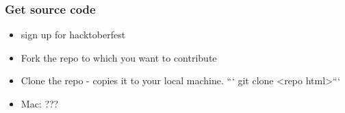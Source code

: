 \documentclass[unknownkeysallowed]{beamer}
\begin{document}
\begin{frame}
    \frametitle{Get source code}
    \begin{itemize}
        \item{sign up for hacktoberfest}
        \item{Fork the repo to which you want to contribute}
        \item{Clone the repo - copies it to your local machine.  ``` git clone <repo html>```}
        \item{Mac: ???}
    \end{itemize}
    \vspace{1cm} %
\end{frame}
\end{document}
